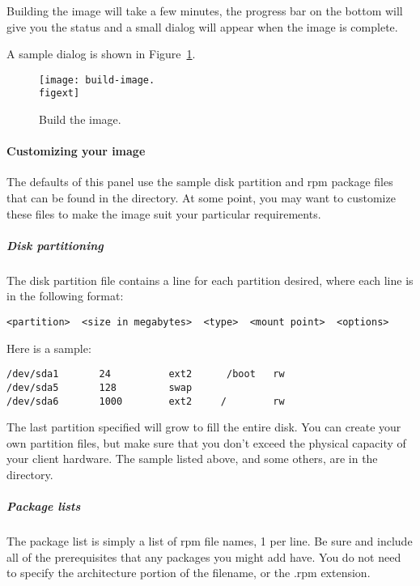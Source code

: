 Building the image will take a few minutes, the progress bar on the bottom 
will give you the status and a small dialog will appear when the image
is complete.
  
A sample dialog is shown in Figure~\ref{fig:detailed-build-image}. 

\begin{figure}[htbp]
  \begin{center}
    \texttt{[image: build-image.\\figext]}
    \caption{Build the image.}
    \label{fig:detailed-build-image}
  \end{center}
\end{figure}
  
\paragraph{Customizing your image}

The defaults of this panel use the sample disk partition and rpm package files
that can be found in the  directory.
At some point, you may want to customize these files to make the image
suit your particular requirements.

\subparagraph{Disk partitioning}

The disk partition file contains a line for each partition desired, where
each line is in the following format:

\begin{verbatim}
<partition>  <size in megabytes>  <type>  <mount point>  <options>
\end{verbatim}

Here is a sample:

\begin{verbatim}
/dev/sda1       24          ext2      /boot   rw
/dev/sda5       128         swap
/dev/sda6       1000        ext2     /        rw
\end{verbatim}

The last partition specified will grow to fill the entire disk.
You can create your own partition files, but make sure that you
don't exceed the physical capacity of your client hardware. The sample
listed above, and some others, are in the  directory.

\subparagraph{Package lists}
The package list is simply a list of rpm file names, 1
per line. Be sure and include all of the prerequisites that
any packages you might add have. You do not need to specify
the architecture portion of the filename, or the .rpm extension.

